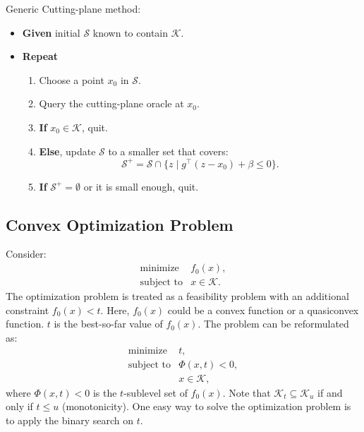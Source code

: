 \documentclass[final,leqno]{siamltex}
\providecommand{\tightlist}{%
  \setlength{\itemsep}{0pt}\setlength{\parskip}{0pt}}
\begin{document}
Generic Cutting-plane method:

\begin{itemize}
\tightlist
\item
  \textbf{Given} initial \(\mathcal{S}\) known to contain \(\mathcal{K}\).
\item
  \textbf{Repeat}

  \begin{enumerate}
  \def\labelenumi{\arabic{enumi}.}
  \tightlist
  \item
    Choose a point \(x_0\) in \(\mathcal{S}\).
  \item
    Query the cutting-plane oracle at \(x_0\).
  \item
    \textbf{If} \(x_0 \in \mathcal{K}\), quit.
  \item
    \textbf{Else}, update \(\mathcal{S}\) to a smaller set that covers:
    \[\mathcal{S}^+ = \mathcal{S} \cap \{z \mid g^\top (z - x_0) + \beta \leq 0\}.\]
  \item
    \textbf{If} \(\mathcal{S}^+ = \emptyset\) or it is small enough, quit.
  \end{enumerate}
\end{itemize}

\hypertarget{sec:convex-optimization-problem}{%
\subsection{Convex Optimization Problem}\label{sec:convex-optimization-problem}}

Consider:
\begin{equation}\begin{array}{ll}
    \text{minimize}     & f_0(x), \\
    \text{subject to}   & x \in \mathcal{K}.
  \end{array}
\label{eq:convex-optimization}\end{equation}
The optimization problem is treated as a feasibility problem with an additional constraint \(f_0(x) < t\). Here, \(f_0(x)\) could be a convex function or a quasiconvex function. \(t\) is the best-so-far value of \(f_0(x)\). The problem can be reformulated as:
\begin{equation}\begin{array}{ll}
    \text{minimize}   & t, \\
    \text{subject to} & \Phi(x, t) < 0, \\
                      & x \in \mathcal{K},
  \end{array}
\label{eq:cvx-in-feasibility-form}\end{equation}
where \(\Phi(x, t) < 0\) is the \(t\)-sublevel set of \(f_0(x)\). Note that \(\mathcal{K}_t \subseteq \mathcal{K}_u\) if and only if \(t \leq u\) (monotonicity). One easy way to solve the optimization problem is to apply the binary search on \(t\).
\end{document}
